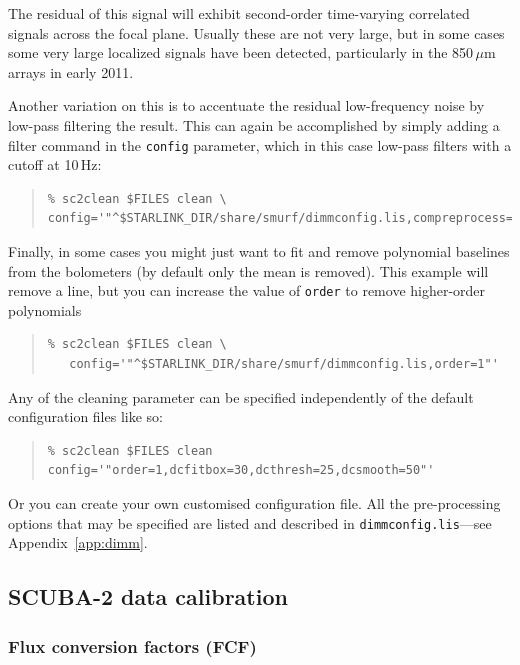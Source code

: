 \documentclass[twoside,11pt]{article}
\newcommand{\htmlref}[2]{#1}
\newcommand{\latexhtml}[2]{#1}
\newcommand{\xlabel}[1]{}
\renewcommand{\_}{\texttt{\symbol{95}}}
\newenvironment{myquote}{
   \color{MidnightBlue}\begin{quote}\begin{small}}{
   \end{small}\end{quote}
}
\newcommand{\param}[1]{\texttt{#1}}
\newcommand{\file}[1]{\texttt{#1}}
\newcommand{\cref}[3]{\latexhtml{#1~\ref{#2}}{\htmlref{#3}{#2}}}
\renewenvironment{myquote}{
      \begin{quote}\begin{small}}{
      \end{small}\end{quote}
   }
\begin{document}
The residual of this signal will exhibit second-order time-varying
correlated signals across the focal plane. Usually these are not very
large, but in some cases some very large localized signals have been
detected, particularly in the 850\,$\mu$m arrays in early 2011.

Another variation on this is to accentuate the residual low-frequency
noise by low-pass filtering the result. This can again be accomplished
by simply adding a filter command in the \param{config} parameter,
which in this case low-pass filters with a cutoff at 10\,Hz:

\begin{myquote}
\begin{verbatim}
% sc2clean $FILES clean \
config='"^$STARLINK_DIR/share/smurf/dimmconfig.lis,compreprocess=1,filt_edgelow=10"'
\end{verbatim}
\end{myquote}

Finally, in some cases you might just want to fit and remove
polynomial baselines from the bolometers (by default only the mean is
removed). This example will remove a line, but you can increase the
value of \param{order} to remove higher-order polynomials

\begin{myquote}
\begin{verbatim}
% sc2clean $FILES clean \
   config='"^$STARLINK_DIR/share/smurf/dimmconfig.lis,order=1"'
\end{verbatim}
\end{myquote}

Any of the cleaning parameter can be specified independently of the
default configuration files like so:
\begin{myquote}
\begin{verbatim}
% sc2clean $FILES clean config='"order=1,dcfitbox=30,dcthresh=25,dcsmooth=50"'
\end{verbatim}
\end{myquote}
Or you can create your own customised configuration file. All the
pre-processing options that may be specified are listed and described
in \file{dimmconfig.lis}---see \cref{Appendix}{app:dimm}{here}.


\newpage
\subsection{\xlabel{calib}SCUBA-2 data calibration}
\label{app:cal}

\subsubsection{\xlabel{fcf}Flux conversion factors (FCF)}
\label{app:fcf}
\end{document}

